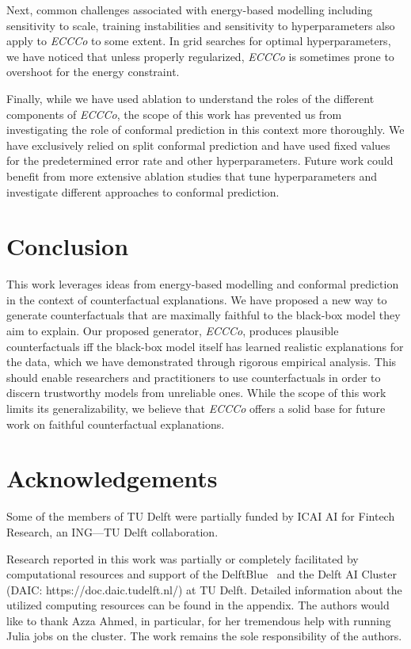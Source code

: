 \documentclass[letterpaper]{article} %
\begin{document}
Next, common challenges associated with energy-based modelling including sensitivity to scale, training instabilities and sensitivity to hyperparameters also apply to \textit{ECCCo} to some extent. In grid searches for optimal hyperparameters, we have noticed that unless properly regularized, \textit{ECCCo} is sometimes prone to overshoot for the energy constraint. 

Finally, while we have used ablation to understand the roles of the different components of \textit{ECCCo}, the scope of this work has prevented us from investigating the role of conformal prediction in this context more thoroughly. We have exclusively relied on split conformal prediction and have used fixed values for the predetermined error rate and other hyperparameters. Future work could benefit from more extensive ablation studies that tune hyperparameters and investigate different approaches to conformal prediction.

\section{Conclusion}

This work leverages ideas from energy-based modelling and conformal prediction in the context of counterfactual explanations. We have proposed a new way to generate counterfactuals that are maximally faithful to the black-box model they aim to explain. Our proposed generator, \textit{ECCCo}, produces plausible counterfactuals iff the black-box model itself has learned realistic explanations for the data, which we have demonstrated through rigorous empirical analysis. This should enable researchers and practitioners to use counterfactuals in order to discern trustworthy models from unreliable ones. While the scope of this work limits its generalizability, we believe that \textit{ECCCo} offers a solid base for future work on faithful counterfactual explanations.

\section*{Acknowledgements}

Some of the members of TU Delft were partially funded by ICAI AI for Fintech Research, an ING---TU Delft
collaboration. 

Research reported in this work was partially or completely facilitated by computational resources and support of the DelftBlue~\citep{DHPC2022} and the Delft AI Cluster (DAIC: https://doc.daic.tudelft.nl/) at TU Delft. Detailed information about the utilized computing resources can be found in the appendix. The authors would like to thank Azza Ahmed, in particular, for her tremendous help with running Julia jobs on the cluster. The work remains the sole responsibility of the authors.
\end{document}

